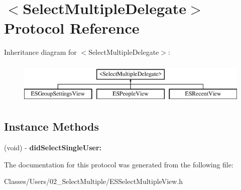 \hypertarget{protocol_select_multiple_delegate-p}{}\section{$<$Select\+Multiple\+Delegate$>$ Protocol Reference}
\label{protocol_select_multiple_delegate-p}
Inheritance diagram for $<$Select\+Multiple\+Delegate$>$\+:\begin{figure}[H]
\begin{center}
\leavevmode
\includegraphics[height=2.000000cm]{protocol_select_multiple_delegate-p}
\end{center}
\end{figure}
\subsection*{Instance Methods}
\begin{DoxyCompactItemize}
\item 
\hypertarget{protocol_select_multiple_delegate-p_a90a9565e72de260dcb8712fe344e99de}{}(void) -\/ {\bfseries did\+Select\+Single\+User\+:}\label{protocol_select_multiple_delegate-p_a90a9565e72de260dcb8712fe344e99de}

\end{DoxyCompactItemize}


The documentation for this protocol was generated from the following file\+:\begin{DoxyCompactItemize}
\item 
Classes/\+Users/02\+\_\+\+Select\+Multiple/E\+S\+Select\+Multiple\+View.\+h\end{DoxyCompactItemize}
